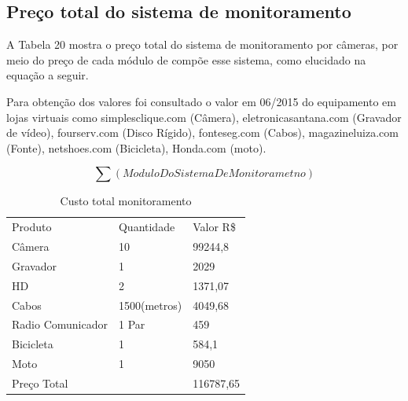 \subsection{Preço total do sistema de monitoramento}

A Tabela 20 mostra o preço total do sistema de monitoramento por câmeras, por meio do preço de cada módulo de compõe esse sistema, como elucidado na equação a seguir.

Para obtenção dos valores foi consultado o valor em 06/2015 do equipamento em lojas virtuais como simplesclique.com (Câmera), eletronicasantana.com (Gravador de vídeo), fourserv.com (Disco Rígido), fonteseg.com (Cabos), magazineluiza.com (Fonte), netshoes.com (Bicicleta), Honda.com (moto).

\begin{equation}
	\sum (Modulo Do Sistema De Monitorametno)
\end{equation}
 
\begin{table}[h]
\centering
\caption{Custo total monitoramento}
\label{Custo total monitoramento}
\begin{tabular}{llll}
 &  &  &  \\ \hline
\multicolumn{1}{|l|}{Produto} & \multicolumn{1}{l|}{Quantidade} & \multicolumn{2}{l|}{Valor R\$} \\ \hline
\multicolumn{1}{|l|}{Câmera} & \multicolumn{1}{l|}{10} & \multicolumn{2}{l|}{99244,8} \\ \hline
\multicolumn{1}{|l|}{Gravador} & \multicolumn{1}{l|}{1} & \multicolumn{2}{l|}{2029} \\ \hline
\multicolumn{1}{|l|}{HD} & \multicolumn{1}{l|}{2} & \multicolumn{2}{l|}{1371,07} \\ \hline
\multicolumn{1}{|l|}{Cabos} & \multicolumn{1}{l|}{1500(metros)} & \multicolumn{2}{l|}{4049,68} \\ \hline
\multicolumn{1}{|l|}{Radio Comunicador} & \multicolumn{1}{l|}{1 Par} & \multicolumn{2}{l|}{459} \\ \hline
\multicolumn{1}{|l|}{Bicicleta} & \multicolumn{1}{l|}{1} & \multicolumn{2}{l|}{584,1} \\ \hline
\multicolumn{1}{|l|}{Moto} & \multicolumn{1}{l|}{1} & \multicolumn{2}{l|}{9050} \\ \hline
\multicolumn{2}{|l|}{Preço Total} & \multicolumn{2}{l|}{116787,65} \\ \hline
\end{tabular}
\end{table}

